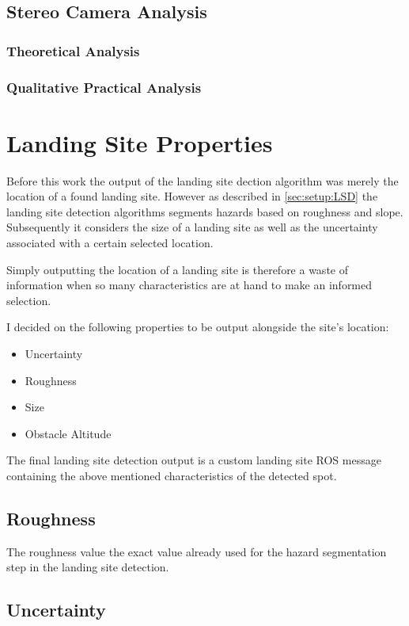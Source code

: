 \subsection{Stereo Camera Analysis}
\subsubsection{Theoretical Analysis}
\subsubsection{Qualitative Practical Analysis}



\section{Landing Site Properties}\label{sec:LSproperties}

Before this work the output of the landing site dection algorithm was merely the location of a found landing site. However as described in \cref{sec:setup:LSD} the landing site detection algorithms segments hazards based on roughness and slope. Subsequently it considers the size of a landing site as well as the uncertainty associated with a certain selected location. 

Simply outputting the location of a landing site is therefore a waste of information when so many characteristics are at hand to make an informed selection. 

I decided on the following properties to be output alongside the site's location:

\begin{itemize}
    \item Uncertainty
    \item Roughness
    \item Size
    \item Obstacle Altitude
\end{itemize}
The final landing site detection output is a custom landing site ROS message containing the above mentioned characteristics of the detected spot.

\subsection{Roughness}

The roughness value the exact value already used for the hazard segmentation step in the landing site detection. 

\subsection{Uncertainty}

